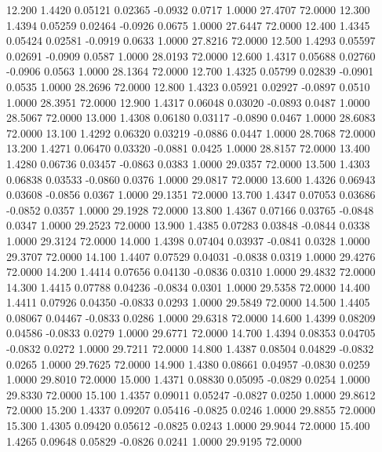   12.200   1.4420   0.05121   0.02365  -0.0932   0.0717   1.0000  27.4707  72.0000
  12.300   1.4394   0.05259   0.02464  -0.0926   0.0675   1.0000  27.6447  72.0000
  12.400   1.4345   0.05424   0.02581  -0.0919   0.0633   1.0000  27.8216  72.0000
  12.500   1.4293   0.05597   0.02691  -0.0909   0.0587   1.0000  28.0193  72.0000
  12.600   1.4317   0.05688   0.02760  -0.0906   0.0563   1.0000  28.1364  72.0000
  12.700   1.4325   0.05799   0.02839  -0.0901   0.0535   1.0000  28.2696  72.0000
  12.800   1.4323   0.05921   0.02927  -0.0897   0.0510   1.0000  28.3951  72.0000
  12.900   1.4317   0.06048   0.03020  -0.0893   0.0487   1.0000  28.5067  72.0000
  13.000   1.4308   0.06180   0.03117  -0.0890   0.0467   1.0000  28.6083  72.0000
  13.100   1.4292   0.06320   0.03219  -0.0886   0.0447   1.0000  28.7068  72.0000
  13.200   1.4271   0.06470   0.03320  -0.0881   0.0425   1.0000  28.8157  72.0000
  13.400   1.4280   0.06736   0.03457  -0.0863   0.0383   1.0000  29.0357  72.0000
  13.500   1.4303   0.06838   0.03533  -0.0860   0.0376   1.0000  29.0817  72.0000
  13.600   1.4326   0.06943   0.03608  -0.0856   0.0367   1.0000  29.1351  72.0000
  13.700   1.4347   0.07053   0.03686  -0.0852   0.0357   1.0000  29.1928  72.0000
  13.800   1.4367   0.07166   0.03765  -0.0848   0.0347   1.0000  29.2523  72.0000
  13.900   1.4385   0.07283   0.03848  -0.0844   0.0338   1.0000  29.3124  72.0000
  14.000   1.4398   0.07404   0.03937  -0.0841   0.0328   1.0000  29.3707  72.0000
  14.100   1.4407   0.07529   0.04031  -0.0838   0.0319   1.0000  29.4276  72.0000
  14.200   1.4414   0.07656   0.04130  -0.0836   0.0310   1.0000  29.4832  72.0000
  14.300   1.4415   0.07788   0.04236  -0.0834   0.0301   1.0000  29.5358  72.0000
  14.400   1.4411   0.07926   0.04350  -0.0833   0.0293   1.0000  29.5849  72.0000
  14.500   1.4405   0.08067   0.04467  -0.0833   0.0286   1.0000  29.6318  72.0000
  14.600   1.4399   0.08209   0.04586  -0.0833   0.0279   1.0000  29.6771  72.0000
  14.700   1.4394   0.08353   0.04705  -0.0832   0.0272   1.0000  29.7211  72.0000
  14.800   1.4387   0.08504   0.04829  -0.0832   0.0265   1.0000  29.7625  72.0000
  14.900   1.4380   0.08661   0.04957  -0.0830   0.0259   1.0000  29.8010  72.0000
  15.000   1.4371   0.08830   0.05095  -0.0829   0.0254   1.0000  29.8330  72.0000
  15.100   1.4357   0.09011   0.05247  -0.0827   0.0250   1.0000  29.8612  72.0000
  15.200   1.4337   0.09207   0.05416  -0.0825   0.0246   1.0000  29.8855  72.0000
  15.300   1.4305   0.09420   0.05612  -0.0825   0.0243   1.0000  29.9044  72.0000
  15.400   1.4265   0.09648   0.05829  -0.0826   0.0241   1.0000  29.9195  72.0000
